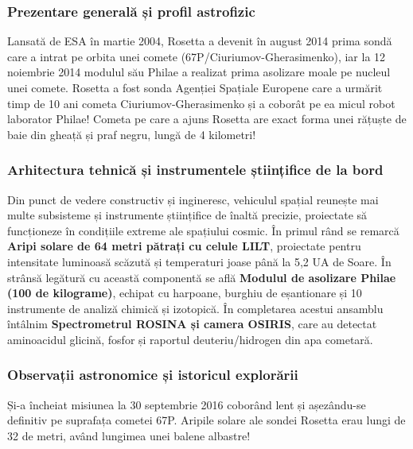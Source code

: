 \subsubsection*{Prezentare generală și profil astrofizic}
Lansată de ESA în martie 2004, Rosetta a devenit în august 2014 prima sondă care a intrat pe orbita unei comete (67P/Ciuriumov-Gherasimenko), iar la 12 noiembrie 2014 modulul său Philae a realizat prima asolizare moale pe nucleul unei comete. Rosetta a fost sonda Agenției Spațiale Europene care a urmărit timp de 10 ani cometa Ciuriumov-Gherasimenko și a coborât pe ea micul robot laborator Philae! Cometa pe care a ajuns Rosetta are exact forma unei rățuște de baie din gheață și praf negru, lungă de 4 kilometri!

\subsubsection*{Arhitectura tehnică și instrumentele științifice de la bord}
Din punct de vedere constructiv și ingineresc, vehiculul spațial reunește mai multe subsisteme și instrumente științifice de înaltă precizie, proiectate să funcționeze în condițiile extreme ale spațiului cosmic. În primul rând se remarcă \textbf{Aripi solare de 64 metri pătrați cu celule LILT}, proiectate pentru intensitate luminoasă scăzută și temperaturi joase până la 5,2 UA de Soare. În strânsă legătură cu această componentă se află \textbf{Modulul de asolizare Philae (100 de kilograme)}, echipat cu harpoane, burghiu de eșantionare și 10 instrumente de analiză chimică și izotopică. În completarea acestui ansamblu întâlnim \textbf{Spectrometrul ROSINA și camera OSIRIS}, care au detectat aminoacidul glicină, fosfor și raportul deuteriu/hidrogen din apa cometară.

\subsubsection*{Observații astronomice și istoricul explorării}
Și-a încheiat misiunea la 30 septembrie 2016 coborând lent și așezându-se definitiv pe suprafața cometei 67P. Aripile solare ale sondei Rosetta erau lungi de 32 de metri, având lungimea unei balene albastre!

